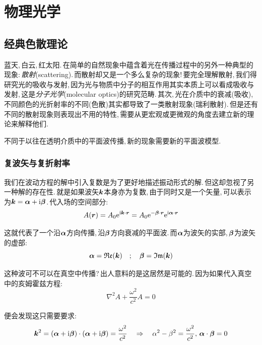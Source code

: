 \setcounter{chapter}{9}
\chapter{物理光学}


\section{经典色散理论}

蓝天,\,白云,\,红太阳.\,在简单的自然现象中蕴含着光在传播过程中的另外一种典型的现象:\,\emph{散射}(scattering).\,而散射却又是一个多么复杂的现象!\,要完全理解散射,\,我们得研究光的吸收与发射,\,因为光与物质中分子的相互作用其实本质上可以看成吸收与发射,\,这是\emph{分子光学}(molecular optics)的研究范畴.\,其次,\,光在介质中的衰减(吸收),\,不同颜色的光折射率的不同(色散)其实都导致了一类散射现象(瑞利散射).\,但是还有不同的散射现象则表现出不用的特性,\,需要从更宏观或更微观的角度去建立新的理论来解释他们.

不同于以往在透明介质中的平面波传播,\,新的现象需要新的平面波模型.

\subsection{复波矢与复折射率}

我们在波动方程的解中引入复数是为了更好地描述振动形式的解.\,但这却忽视了另一种解的存在性.\,就是如果波矢$\boldsymbol{k}$本身亦为复数,\,由于同时又是一个矢量,\,可以表示为$\boldsymbol{k}=\boldsymbol{\alpha}+{\rm i}\boldsymbol{\beta}$.\,代入场的空间部分:
\[A(\boldsymbol{r})=A_0{\rm e}^{{\rm i} \boldsymbol{k}\cdot \boldsymbol{r}}=A_0{\rm e}^{- \boldsymbol{\beta}\cdot \boldsymbol{r}}{\rm e}^{{\rm i} \boldsymbol{\alpha}\cdot \boldsymbol{r}}\]

这就代表了一个沿$\boldsymbol{\alpha}$方向传播,\,沿$\boldsymbol{\beta}$方向衰减的平面波.\,而$\boldsymbol{\alpha}$为波矢的实部,\,$\boldsymbol{\beta}$为波矢的虚部:
\[\boldsymbol{\alpha} =\mathfrak{Re} (\boldsymbol{k})\quad;\quad \boldsymbol{\beta}=\mathfrak{Im} (\boldsymbol{k})\]

这种波可不可以在真空中传播?\,出人意料的是这居然是可能的.\,因为如果代入真空中的亥姆霍兹方程:
\[\nabla ^2 A+\frac{\omega^2}{c^2}A=0\]

便会发现这只需要要求:
\[\boldsymbol{k}^2=(\boldsymbol{\alpha}+{\rm i} \boldsymbol{\beta})\cdot(\boldsymbol{\alpha}+{\rm i} \boldsymbol{\beta})=\frac{\omega^2}{c^2} \quad \Rightarrow \quad \alpha^2-\beta^2=\frac{\omega^2}{c^2},\,\boldsymbol{\alpha}\cdot\boldsymbol{\beta}=0\]

